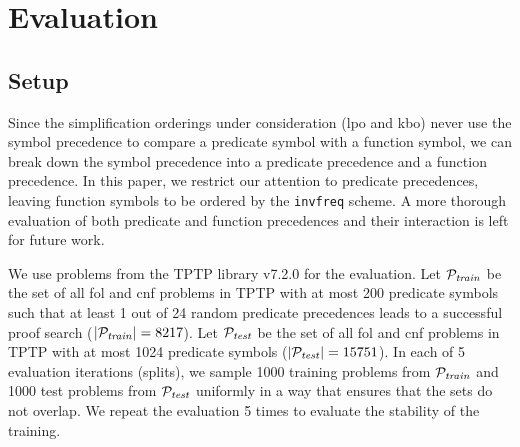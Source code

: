 \documentclass{ceurart}
\begin{document}
\section{Evaluation}
\label{sec:evaluation}

\subsection{Setup}

Since the simplification orderings under consideration (\acrshort*{lpo} and \acrshort*{kbo})
never use the symbol precedence to compare a predicate symbol with a function symbol,
we can break down the symbol precedence  into a predicate precedence and a function precedence.
In this paper, we restrict our attention to predicate precedences,
leaving function symbols to be ordered by the \texttt{invfreq} scheme.
A more thorough evaluation of both predicate and function precedences and their interaction
is left for future work.

%	
%	
%	
%	

We use problems from the TPTP library v7.2.0 \cite{Sut17} for the evaluation.
Let \(\mathcal{P}_{\mathit{train}}\) be the set of all \acrshort*{fol} and \acrshort*{cnf} problems in TPTP
with at most 200 predicate symbols such that at least 1 out of 24 random predicate precedences
leads to a successful proof search (\(|\mathcal{P}_{\mathit{train}}| = 8217\)).
Let \(\mathcal{P}_{\mathit{test}}\) be the set of all \acrshort*{fol} and \acrshort*{cnf} problems in TPTP
with at most 1024 predicate symbols (\(|\mathcal{P}_{\mathit{test}}| = 15751\)).
In each of 5 evaluation iterations (splits),
we sample 1000 training problems from \(\mathcal{P}_{\mathit{train}}\)
and 1000 test problems from \(\mathcal{P}_{\mathit{test}}\)
uniformly in a way that ensures that the sets do not overlap.
We repeat the evaluation 5 times to evaluate the stability of the training.
\end{document}
